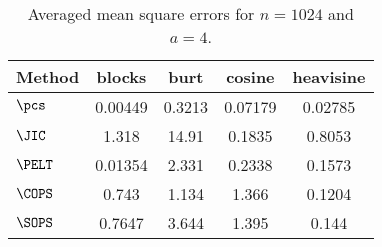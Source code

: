 \begin{table}[ht]
\centering
\begin{tabular}{lcccc}
  \hline
Method & blocks & burt & cosine & heavisine \\ 
  \hline
$\pcs$ & 0.00449 & 0.3213 & 0.07179 & 0.02785 \\ 
  $\JIC$ & 1.318 & 14.91 & 0.1835 & 0.8053 \\ 
  $\PELT$ & 0.01354 & 2.331 & 0.2338 & 0.1573 \\ 
  $\COPS$ & 0.743 & 1.134 & 1.366 & 0.1204 \\ 
  $\SOPS$ & 0.7647 & 3.644 & 1.395 & 0.144 \\ 
   \hline
\end{tabular}
\caption{Averaged mean square errors for $n = 1024$ and $a = 4$.} 
\label{tab:aMSEn1024a4}
\end{table}
